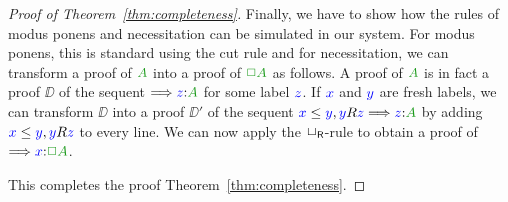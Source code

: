 \begin{proof}[Proof of Theorem~\ref{thm:completeness}]
  
  
  Finally, we have to show how the rules of modus ponens and
  necessitation can be simulated in our system. For modus ponens, this
  is standard using the cut rule and for necessitation, we can
  transform a proof of $\fm A$ into a proof of $\fm{\BOX A}$ as
  follows.
  A proof of $\fm A$ is in fact a proof $\DD$ of the sequent
  $\SEQ{\labels{z}{A}}$ for some label ${\color{blue}{z}}$. If ${\color{blue}{x}}$ and ${\color{blue}{y}}$
  are fresh labels, we can transform $\DD$ into a proof $\DD'$ of the
  sequent $\futs xy, \accs yz \SEQ \labels{z}{A}$ by adding ${\color{blue}{x}}\le{{\color{blue}{y}}},
  {\color{blue}{y}}R{\color{blue}{z}}$ to every line. We can now apply the $\mathsf{\mathord{\Box}}_{\mathsf{R}}$-rule to
  obtain a proof of $\SEQ \labels{x}{\BOX A}$.
  
%
%	
%	
%	
	
%	
%	
%	
%	
%	

  
  This completes the proof Theorem~\ref{thm:completeness}.
\end{proof}


